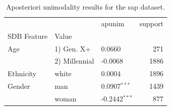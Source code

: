 \begin{table}[ht]\centering
\caption{Aposteriori unimodality results for the sap dataset.}
\label{tab:sap}
\begin{tabular}{lllr}
\toprule
 &  & apunim & support \\
SDB Feature & Value &  &  \\
\midrule
Age & 1) Gen. X+ & 0.0660 & 271 \\
 & 2) Millennial & -0.0068 & 1886 \\
Ethnicity & white & 0.0004 & 1896 \\
Gender & man & 0.0907$^{***}$ & 1439 \\
 & woman & -0.2442$^{***}$ & 877 \\
\bottomrule
\end{tabular}
\end{table}
